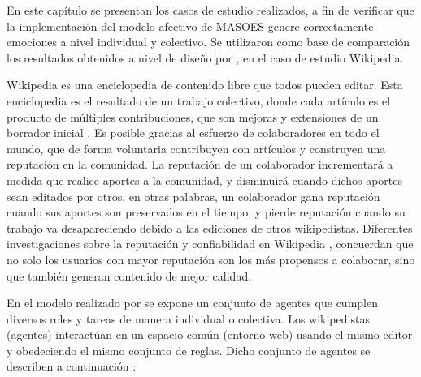 %
%
%


En este capítulo se presentan los casos de estudio realizados, a fin de verificar que
la implementación del modelo afectivo de MASOES genere correctamente
emociones a nivel individual y colectivo.
Se utilizaron como base de comparación los
resultados obtenidos a nivel de diseño por \cite{perozo2012}, en el caso de
estudio Wikipedia.

Wikipedia es una enciclopedia de contenido libre que todos pueden editar. Esta
enciclopedia es el resultado de un trabajo colectivo, donde cada artículo es el
producto de múltiples contribuciones, que son mejoras y extensiones de un
borrador inicial \citep{perozo2011}.
Es posible gracias al esfuerzo de colaboradores en todo el
mundo, que de forma voluntaria contribuyen con artículos
y construyen una reputación en la comunidad.
La reputación de un colaborador incrementará a medida que realice
aportes a la comunidad, y disminuirá cuando dichos aportes sean editados por
otros, en otras palabras, un colaborador gana reputación cuando
sus aportes son preservados en el tiempo, y pierde reputación cuando su trabajo
va desapareciendo debido a las ediciones de otros wikipedistas.
Diferentes investigaciones sobre la reputación
y confiabilidad en Wikipedia \citep{anthony2009reputation, javanmardi2009user,
de2011reputation}, concuerdan que no solo los usuarios con mayor reputación son
los más propensos a colaborar, sino que también generan contenido de mejor
calidad.

En el modelo realizado por \cite{perozo2011}
se expone un conjunto de agentes que cumplen diversos roles y tareas de manera individual o colectiva.
Los wikipedistas (agentes) interactúan en un espacio común (entorno web) usando el mismo
editor y obedeciendo el mismo conjunto de reglas.
Dicho conjunto de agentes se describen a continuación :

